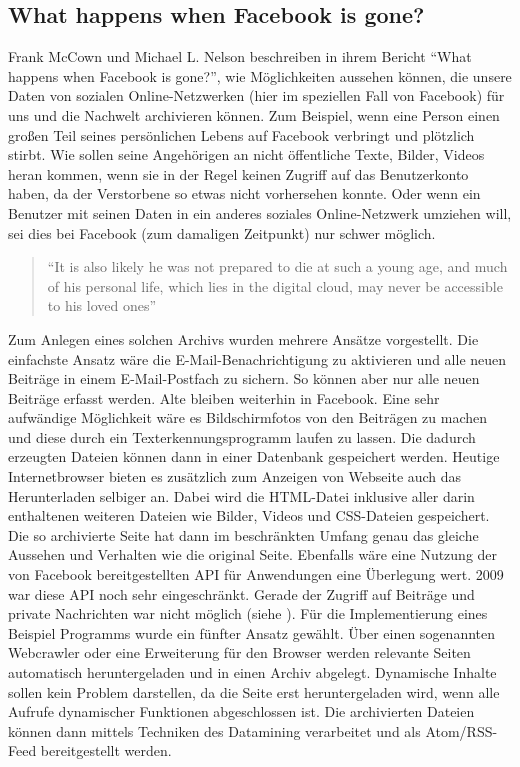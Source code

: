 \subsection{What happens when Facebook is gone?} %
\label{sub:what_happens_when_facebook_is_gone}

Frank McCown und Michael L. Nelson beschreiben in ihrem Bericht \enquote{What happens when Facebook is gone?}\cite{McCown2009}, wie Möglichkeiten aussehen können, die unsere Daten von sozialen Online-Netzwerken (hier im speziellen Fall von Facebook) für uns und die Nachwelt archivieren können. Zum Beispiel, wenn eine Person einen großen Teil seines persönlichen Lebens auf Facebook verbringt und plötzlich stirbt. Wie sollen seine Angehörigen an nicht öffentliche Texte, Bilder, Videos heran kommen, wenn sie in der Regel keinen Zugriff auf das Benutzerkonto haben, da der Verstorbene so etwas nicht vorhersehen konnte. Oder wenn ein Benutzer mit seinen Daten in ein anderes soziales Online-Netzwerk umziehen will, sei dies bei Facebook (zum damaligen Zeitpunkt) nur schwer möglich.

\begin{quote}
    \enquote{It is also likely he was not prepared to die at such a young age, and much of his personal life, which lies in the digital \grqq cloud\grqq, may never be accessible to his loved ones}
    \cite[S.\,251]{McCown2009}
\end{quote}

Zum Anlegen eines solchen Archivs wurden mehrere Ansätze vorgestellt. Die einfachste Ansatz wäre die E-Mail-Benachrichtigung zu aktivieren und alle neuen Beiträge in einem E-Mail-Postfach zu sichern. So können aber nur alle neuen Beiträge erfasst werden. Alte bleiben weiterhin in Facebook. Eine sehr aufwändige Möglichkeit wäre es Bildschirmfotos von den Beiträgen zu machen und diese durch ein Texterkennungsprogramm laufen zu lassen. Die dadurch erzeugten Dateien können dann in einer Datenbank gespeichert werden. Heutige Internetbrowser bieten es zusätzlich zum Anzeigen von Webseite auch das Herunterladen selbiger an. Dabei wird die HTML-Datei inklusive aller darin enthaltenen weiteren Dateien wie Bilder, Videos und CSS-Dateien gespeichert. Die so archivierte Seite hat dann im beschränkten Umfang genau das gleiche Aussehen und Verhalten wie die original Seite. Ebenfalls wäre eine Nutzung der von Facebook bereitgestellten API für Anwendungen eine Überlegung wert. 2009 war diese API noch sehr eingeschränkt. Gerade der Zugriff auf Beiträge und private Nachrichten war nicht möglich (siehe \cite[S.\,253, Table 1]{McCown2009}). Für die Implementierung eines Beispiel Programms wurde ein fünfter Ansatz gewählt. Über einen sogenannten Webcrawler oder eine Erweiterung für den Browser werden relevante Seiten automatisch heruntergeladen und in einen Archiv abgelegt. Dynamische Inhalte sollen kein Problem darstellen, da die Seite erst heruntergeladen wird, wenn alle Aufrufe dynamischer Funktionen abgeschlossen ist. Die archivierten Dateien können dann mittels Techniken des Datamining verarbeitet und als Atom/RSS-Feed bereitgestellt werden. 

